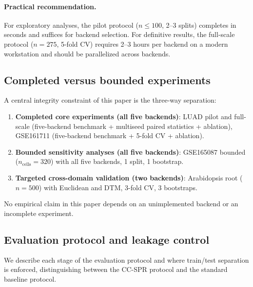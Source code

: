 \documentclass[11pt]{article}
\begin{document}
\paragraph{Practical recommendation.}
For exploratory analyses, the pilot protocol ($n \leq 100$, 2--3 splits) completes in seconds and suffices for backend selection.
For definitive results, the full-scale protocol ($n = 275$, 5-fold CV) requires 2--3 hours per backend on a modern workstation and should be parallelized across backends.

\subsection{Completed versus bounded experiments}

A central integrity constraint of this paper is the three-way separation:
\begin{enumerate}[leftmargin=1.5em]
\item \textbf{Completed core experiments (all five backends)}: LUAD pilot and full-scale (five-backend benchmark + multiseed paired statistics + ablation), GSE161711 (five-backend benchmark + 5-fold CV + ablation).
\item \textbf{Bounded sensitivity analyses (all five backends)}: GSE165087 bounded ($n_{\text{cells}} = 320$) with all five backends, 1 split, 1 bootstrap.
\item \textbf{Targeted cross-domain validation (two backends)}: Arabidopsis root ($n = 500$) with Euclidean and DTM, 3-fold CV, 3 bootstraps.
\end{enumerate}
No empirical claim in this paper depends on an unimplemented backend or an incomplete experiment.

\subsection{Evaluation protocol and leakage control}
\label{sec:leakage}

We describe each stage of the evaluation protocol and where train/test separation is enforced, distinguishing between the CC-SPR protocol and the standard baseline protocol.
\end{document}
